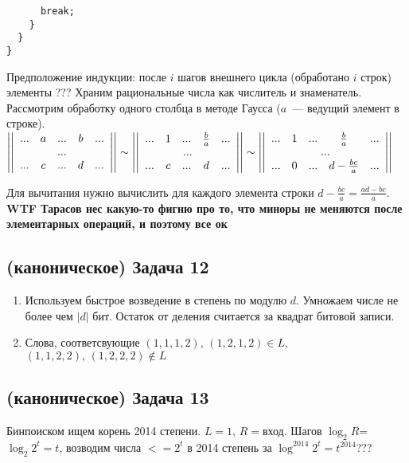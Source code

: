 \documentclass[a4paper]{article}
\newcommand{\matrixl}{\left|\left|}
\newcommand{\matrixr}{\right|\right|}
\begin{document}
\begin{enumerate}
\begin{lstlisting}
      break;
    }
  }
}
\end{lstlisting}
Предположение индукции: после $i$ шагов внешнего цикла (обработано $i$ строк) элементы ???\newline
Храним рациональные числа как числитель и знаменатель.\newline
Рассмотрим обработку одного столбца в методе Гаусса ($a$~--- ведущий элемент в строке).\newline
$\matrixl
\begin{array}{ccccc}
... & a & ... & b & ...\\
\multicolumn{5}{c}{...}\\
... & c & ... & d & ...\\
\end{array}
\matrixr\sim
\matrixl
\begin{array}{ccccc}
... & 1 & ... & \frac{b}{a} & ...\\
\multicolumn{5}{c}{...}\\
... & c & ... & d & ...\\
\end{array}
\matrixr\sim
\matrixl
\begin{array}{ccccc}
... & 1 & ... & \frac{b}{a} & ...\\
\multicolumn{5}{c}{...}\\
... & 0 & ... & d-\frac{bc}{a} & ...\\
\end{array}
\matrixr
$

Для вычитания нужно вычислить для каждого элемента строки $d-\frac{bc}{a}=\frac{ad-bc}{a}$.\newline
\textbf{WTF Тарасов нес какую-то фигню про то, что миноры не меняются после элементарных операций, и поэтому все ок}
\subsection*{(каноническое) Задача 12}
\begin{enumerate}
\item Используем быстрое возведение в степень по модулю $d$. Умножаем числе не более чем $|d|$ бит. Остаток от деления считается за квадрат битовой записи.
\item Слова, соответсвующие $(1,1,1,2),\,(1,2,1,2)\in L$, $(1,1,2,2),\,(1,2,2,2)\notin L$
\end{enumerate}
\end{enumerate}
\subsection*{(каноническое) Задача 13}
Бинпоиском ищем корень 2014 степени. $L=1$, $R=$вход. Шагов $\log_{2} R$=$\log_2 2^t=t$, возводим числа $<= 2^t$ в 2014 степень за $\log^{2014} 2^t=t^{2014}$???
\end{document}
